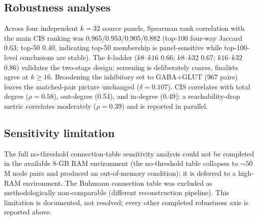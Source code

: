 \subsection{Robustness analyses}
Across four independent $k{=}32$ source panels, Spearman rank correlation
with the main CIS ranking was 0.965/0.953/0.905/0.882 (top-100 four-way
Jaccard 0.63; top-50 0.40, indicating top-50 membership is panel-sensitive
while top-100-level conclusions are stable). The $k$-ladder
($k8$--$k16$ 0.66; $k8$--$k32$ 0.67; $k16$--$k32$ 0.86) validates the
two-stage design: screening is deliberately coarse, finalists agree at
$k\geq16$. Broadening the inhibitory set to GABA+GLUT (967 pairs) leaves
the matched-pair picture unchanged ($\delta=0.107$). CIS correlates with
total degree ($\rho=0.58$), out-degree (0.54), and in-degree (0.49); a
reachability-drop metric correlates moderately ($\rho=0.39$) and is
reported in parallel.

\subsection{Sensitivity limitation}
The full no-threshold connection-table sensitivity analysis could not be
completed in the available 8-GB RAM environment (the no-threshold table
collapses to ${\sim}50$M node pairs and produced an out-of-memory
condition); it is deferred to a high-RAM environment. The Buhmann
connection table was excluded as methodologically non-comparable
(different reconstruction pipeline). This limitation is documented, not
resolved; every other completed robustness axis is reported above.
